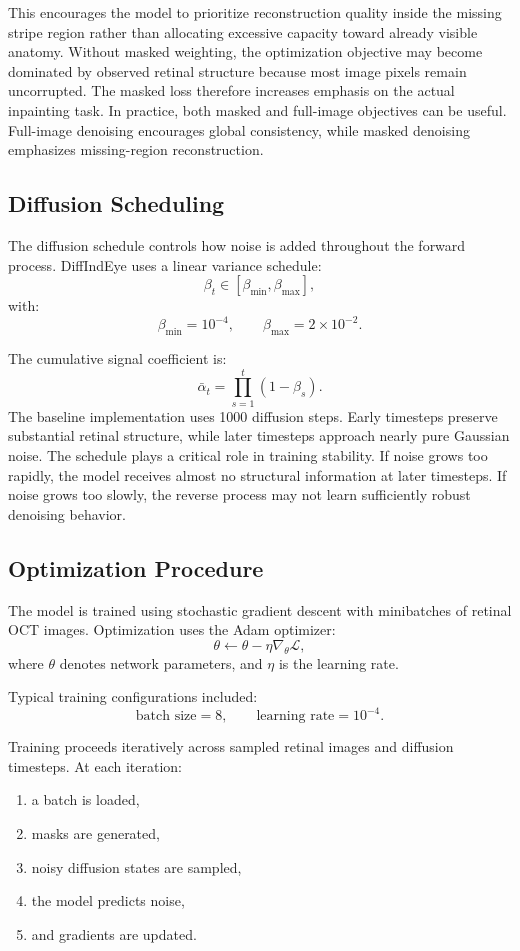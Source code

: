 \documentclass[12pt,oneside]{article}
\begin{document}
This encourages the model to prioritize reconstruction quality inside the missing stripe region rather than allocating excessive capacity toward already visible anatomy.
Without masked weighting, the optimization objective may become dominated by observed retinal structure because most image pixels remain uncorrupted. The masked loss therefore increases emphasis on the actual inpainting task.
In practice, both masked and full-image objectives can be useful. Full-image denoising encourages global consistency, while masked denoising emphasizes missing-region reconstruction.

\subsection*{Diffusion Scheduling}

The diffusion schedule controls how noise is added throughout the forward process. DiffIndEye uses a linear variance schedule:
\[
\beta_t
\in
[\beta_{\min},\beta_{\max}],
\]
with:
\[
\beta_{\min}=10^{-4},
\qquad
\beta_{\max}=2\times10^{-2}.
\]

The cumulative signal coefficient is:
\[
\bar{\alpha}_t
=
\prod_{s=1}^t(1-\beta_s).
\]
The baseline implementation uses 1000 diffusion steps. Early timesteps preserve substantial retinal structure, while later timesteps approach nearly pure Gaussian noise.
The schedule plays a critical role in training stability. If noise grows too rapidly, the model receives almost no structural information at later timesteps. If noise grows too slowly, the reverse process may not learn sufficiently robust denoising behavior.

\subsection*{Optimization Procedure}

The model is trained using stochastic gradient descent with minibatches of retinal OCT images. Optimization uses the Adam optimizer:
\[
\theta
\leftarrow
\theta
-
\eta
\nabla_\theta \mathcal{L},
\]
where $\theta$ denotes network parameters, and $\eta$ is the learning rate.

Typical training configurations included:
\[
\text{batch size}=8,
\qquad
\text{learning rate}=10^{-4}.
\]

Training proceeds iteratively across sampled retinal images and diffusion timesteps. At each iteration:
\begin{enumerate}
    \item a batch is loaded,
    \item masks are generated,
    \item noisy diffusion states are sampled,
    \item the model predicts noise,
    \item and gradients are updated.
\end{enumerate}
\end{document}
